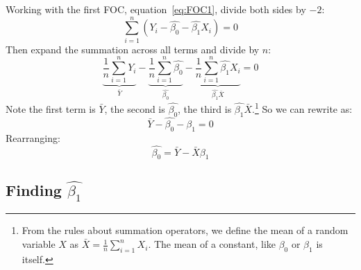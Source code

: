 \documentclass{article}
\begin{document}
Working with the first FOC, equation~\ref{eq:FOC1}, divide both sides by $-2$: 
\begin{equation}
\displaystyle\sum^n_{i=1} (Y_i-\hat{\beta_0}-\hat{\beta_1} X_i)=0 	
\end{equation}
Then expand the summation across all terms and divide by $n$: 
\begin{equation}
\underbrace{\frac{1}{n}\sum^n_{i=1} Y_i}_{\bar{Y}}-\underbrace{\frac{1}{n}\sum^n_{i=1}\hat{\beta_0}}_{\hat{\beta_0}}-\underbrace{\frac{1}{n}\sum^n_{i=1} \hat{\beta_1} X_i}_{\hat{\beta_1}\bar{X}}=0 	
\end{equation}
Note the first term is $\bar{Y}$, the second is $\hat{\beta_0}$, the third is $\hat{\beta_1}\bar{X}$.\footnote{From the rules about summation operators, we define the mean of a random variable $X$ as $\bar{X}=\frac{1}{n}\displaystyle\sum_{i=1}^n X_i$. The mean of a constant, like $\beta_0$ or $\beta_1$ is itself.} So we can rewrite as: 
\begin{equation}
\bar{Y}-\hat{\beta_0}-\beta_1=0
\end{equation}
Rearranging: 
\begin{equation}
\hat{\beta_0}=\bar{Y}-\bar{X}\beta_1
\label	{eq:beta0}
\end{equation}

\subsection{Finding $\hat{\beta_1}$}
\end{document}
